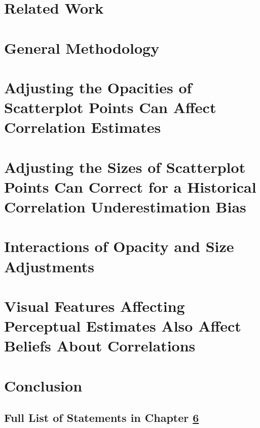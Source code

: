 \chapter{Related Work}\label{chap:related_work}

\chapter{General Methodology}\label{chap:gen_methods}

\chapter{Adjusting the Opacities of Scatterplot Points Can Affect Correlation Estimates}\label{chap:adjusting_opacity}

\chapter{Adjusting the Sizes of Scatterplot Points Can Correct for a Historical Correlation Underestimation Bias}\label{chap:adjusting_size}

\chapter{Interactions of Opacity and Size Adjustments}\label{chap:interactions_opacity_size}

\chapter{Visual Features Affecting Perceptual Estimates Also Affect Beliefs About Correlations}\label{chap:belief_change}

\chapter{Conclusion}\label{chap:conclusion}


\printbibliography[title={References},heading=bibintoc] %


\begin{uomappendix}
	\chapter{Full List of Statements in Chapter \ref{chap:belief_change}} \label{chap:appendix_A}
	
\end{uomappendix}
